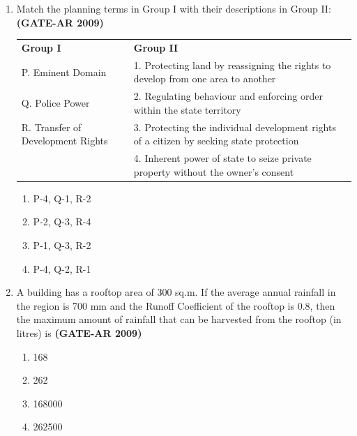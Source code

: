 \documentclass[a4paper,10pt]{article}
\begin{document}
\begin{enumerate}
    \item Match the planning terms in Group I with their descriptions in Group II: \hfill \textbf{(GATE-AR 2009)} \\
    \begin{tabular}{ l l }
	\textbf{Group I} & \textbf{Group II} \\
	P. Eminent Domain & 1. Protecting land by reassigning the rights to develop from one area to another \\
	Q. Police Power & 2. Regulating behaviour and enforcing order within the state territory \\
	R. Transfer of Development Rights & 3. Protecting the individual development rights of a citizen by seeking state protection \\
	& 4. Inherent power of state to seize private property without the owner’s consent \\
	\end{tabular}
	\begin{multicols}{2}
	\begin{enumerate}
        \item P-4, Q-1, R-2
        \item P-2, Q-3, R-4
        \item P-1, Q-3, R-2
        \item P-4, Q-2, R-1
    \end{enumerate}
	\end{multicols}

    \item A building has a rooftop area of 300 sq.m. If the average annual rainfall in the region is 700 mm and the Runoff Coefficient of the rooftop is 0.8, then the maximum amount of rainfall that can be harvested from the rooftop (in litres) is \hfill \textbf{(GATE-AR 2009)}
    \begin{multicols}{2}
	\begin{enumerate}
        \item 168
        \item 262
        \item 168000
        \item 262500
    \end{enumerate}
	\end{multicols}


\end{enumerate}
\end{document}

